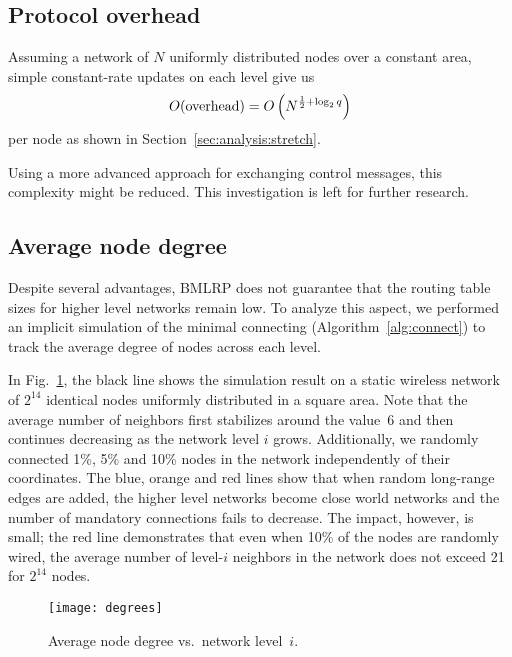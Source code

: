 \documentclass[conference]{IEEEtran}
\theoremstyle{definition}
\begin{document}
\subsection{Protocol overhead}
\label{sec:analysis:overhead}

Assuming a network of $N$ uniformly distributed nodes over a constant area, simple constant-rate updates on each level give us
%
\begin{equation*}
    O({\rm overhead}) = O \left ( N^{\frac{1}{2} + \log_2 q} \right )
\end{equation*}
%
per node as shown in Section~\ref{sec:analysis:stretch}.

Using a more advanced approach for exchanging control messages, this complexity might be reduced. This investigation is left for further research.


\subsection{Average node degree}
\label{sec:analysis:nodedegree}

Despite several advantages, BMLRP does not guarantee that the routing table sizes for higher level networks remain low. To analyze this aspect, we performed an implicit simulation of the minimal connecting 
(Algorithm~\ref{alg:connect}) to track the average degree of nodes across each level.

In Fig.~\ref{fig:degrees}, the black line shows the simulation result on a static wireless network of $2^{14}$ identical nodes uniformly distributed in a square area. Note that the average number of neighbors first stabilizes around 
the value~6 and then continues decreasing as the network level $i$ grows. Additionally, we randomly connected 1\%, 5\% and 10\% nodes in the network independently of their coordinates. The blue, orange and red lines show that when random long-range edges are added, the higher level networks become close world networks and the number of mandatory connections fails to decrease. The impact, however, is small; the red line demonstrates that even when 10\% of the nodes are randomly wired, the average number of level-$i$ neighbors in the network does not exceed 21 for $2^{14}$ nodes.

\begin{figure}[H]
   \texttt{[image: degrees]}

   \caption{Average node degree vs.\ network level~$i$.}
    \label{fig:degrees}
\end{figure}
\end{document}
